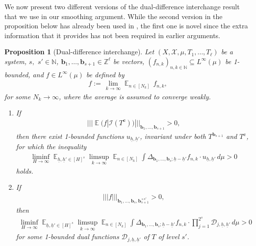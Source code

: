 \documentclass[11pt]{amsart}
\newtheorem{proposition}[lemma]{Proposition}
\theoremstyle{definition}
\newcommand{\N}{{\mathbb N}}
\newcommand{\Z}{{\mathbb Z}}
\newcommand{\CD}{{\mathcal D}}
\newcommand{\CI}{{\mathcal I}}
\newcommand{\CX}{{\mathcal X}}
\newcommand{\bc}{{\mathbf{c}}}
\renewcommand{\b}{{\textbf{b}}}
\newcommand{\uh}{{\underline{h}}}
\newcommand{\norm}[1]{\left\Vert #1\right\Vert}
\newcommand{\nnorm}[1]{\lvert\!|\!| #1|\!|\!\rvert}
\DeclareMathOperator*{\E}{\mathbb{E}}
\begin{document}
We now present two different versions of the dual-difference interchange result that we use in our smoothing argument. While the second version in the proposition below has already been used in \cite{FrKu22}, the first one is novel since the extra information that it provides has not been required in earlier arguments.

\begin{proposition}[Dual-difference interchange]\label{dual-difference interchange}
	Let $(X, \CX, \mu,T_1, \ldots, T_\ell)$ be a system,  $s,$ $s'\in \N$, $\b_1, \ldots, \b_{s+1}\in\Z^\ell$ be vectors,
	$(f_{n,k})_{n,k\in\N}\subseteq L^\infty(\mu)$ be 1-bounded, and $f\in L^\infty(\mu)$ be defined by
	\begin{align*}
        f:=\, \lim_{k\to\infty}\E_{n\in [N_k]}\, f_{n,k},
	\end{align*}
	for some $N_k\to\infty$, where the average is assumed to converge weakly.
	\begin{enumerate}
	    \item If
	\begin{align}\label{seminorm of conditional expectation}
	    \nnorm{\E(f|\CI(T^\bc))}_{\b_1, \ldots, \b_{s+1}}>0,
	\end{align}
	then there exist 1-bounded functions $u_{\uh, \uh'}$, invariant under both $T^{\b_{s+1}}$ and $T^{\bc}$, for which the inequality
    \begin{align*}
        \liminf_{H\to\infty}\E_{\uh, \uh'\in [H]^s}\limsup_{k\to\infty} \E_{n\in[N_k]}
        \int\Delta_{\b_1, \ldots, \b_s; \uh-\uh'}f_{n,k} \cdot u_{\uh, \uh'} \, d\mu >0
    \end{align*}
    holds.
    \item 	If
	\begin{align*}%
	    \nnorm{f}_{\b_1, \ldots, \b_s, \b_{s+1}^{\times s'}}>0,
	\end{align*}
	then
	\begin{align*}
            \liminf_{H\to\infty}\E_{\uh, \uh'\in [H]^s}\limsup_{k\to\infty} \E_{n\in[N_k]} \int\Delta_{\b_1, \ldots, \b_s; \uh-\uh'}f_{n,k} \cdot \prod_{j=1}^{2^s}\CD_{j,\uh,\uh'} \, d\mu >0
    \end{align*}
    for some 1-bounded  dual functions $\CD_{j, \uh, \uh'}$ of $T$ of level $s'$.
	\end{enumerate}

\end{proposition}
\end{document}
